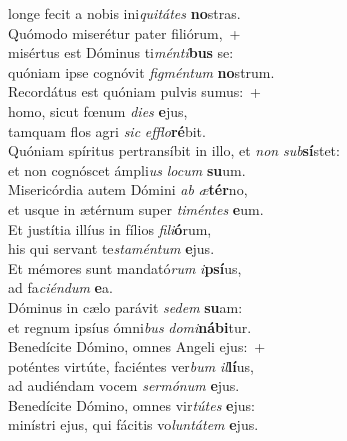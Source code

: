 \evenverse longe fecit a nobis ini\textit{qui}\textit{tá}\textit{tes} \textbf{no}stras.\\
\oddverse Quómodo miserétur pater filiórum,~+\\
\oddverse  misértus est Dóminus ti\textit{mén}\textit{ti}\textbf{bus} se:~\*\\
\oddverse quóniam ipse cognóvit \textit{fig}\textit{mén}\textit{tum} \textbf{no}strum.\\
\evenverse Recordátus est quóniam pulvis sumus:~+\\
\evenverse  homo, sicut fœnum \textit{di}\textit{es} \textbf{e}jus,~\*\\
\evenverse tamquam flos agri \textit{sic} \textit{ef}\textit{flo}\textbf{ré}bit.\\
\oddverse Quóniam spíritus pertransíbit in illo, et \textit{non} \textit{sub}\textbf{sí}stet:~\*\\
\oddverse et non cognóscet ámpli\textit{us} \textit{lo}\textit{cum} \textbf{su}um.\\
\evenverse Misericórdia autem Dómini \textit{ab} \textit{æ}\textbf{tér}no,~\*\\
\evenverse et usque in ætérnum super \textit{ti}\textit{mén}\textit{tes} \textbf{e}um.\\
\oddverse Et justítia illíus in fílios \textit{fi}\textit{li}\textbf{ó}rum,~\*\\
\oddverse his qui servant te\textit{sta}\textit{mén}\textit{tum} \textbf{e}jus.\\
\evenverse Et mémores sunt mandató\textit{rum} \textit{i}\textbf{psí}us,~\*\\
\evenverse ad fa\textit{ci}\textit{én}\textit{dum} \textbf{e}a.\\
\oddverse Dóminus in cælo parávit \textit{se}\textit{dem} \textbf{su}am:~\*\\
\oddverse et regnum ipsíus ómni\textit{bus} \textit{do}\textit{mi}\textbf{ná}\textbf{bi}tur.\\
\evenverse Benedícite Dómino, omnes Angeli ejus:~+\\
\evenverse  poténtes virtúte, faciéntes ver\textit{bum} \textit{il}\textbf{lí}us,~\*\\
\evenverse ad audiéndam vocem \textit{ser}\textit{mó}\textit{num} \textbf{e}jus.\\
\oddverse Benedícite Dómino, omnes vir\textit{tú}\textit{tes} \textbf{e}jus:~\*\\
\oddverse minístri ejus, qui fácitis vo\textit{lun}\textit{tá}\textit{tem} \textbf{e}jus.\\
